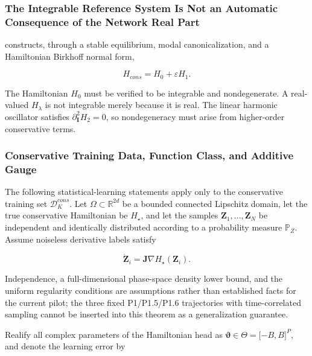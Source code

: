 \subsubsection{The Integrable Reference System Is Not an Automatic Consequence of the Network Real Part}\label{sec:chnn-4-6-1}

 constructs, through a stable equilibrium, modal canonicalization, and a Hamiltonian Birkhoff normal form,

\begin{equation}
\label{eq:chnn-4-35}
H_{cons} = H_{0} + \varepsilon H_{1}.
\end{equation}

The Hamiltonian \(H_{0}\) must be verified to be integrable and nondegenerate. A real-valued \(H_{\lambda}\) is not integrable merely because it is real. The linear harmonic oscillator satisfies \(\partial_{\mathbf{I}}^{2}H_{2}=0\), so nondegeneracy must arise from higher-order conservative terms.

\subsubsection{Conservative Training Data, Function Class, and Additive Gauge}\label{sec:chnn-4-6-2}

The following statistical-learning statements apply only to the conservative training set \(\mathcal{D}_{K}^{cons}\). Let \(\Omega\subset\mathbb{R}^{2d}\) be a bounded connected Lipschitz domain, let the true conservative Hamiltonian be \(H_{\star}\), and let the samples \(\mathbf{Z}_{1},\ldots,\mathbf{Z}_{N}\) be independent and identically distributed according to a probability measure \(\mathbb{P}_{Z}\). Assume noiseless derivative labels satisfy

\begin{equation}
\label{eq:chnn-4-36}
{\dot{\mathbf{Z}}}_{i} = \mathbf{J}\nabla H_{\star}\left( \mathbf{Z}_{i} \right).
\end{equation}

Independence, a full-dimensional phase-space density lower bound, and the uniform regularity conditions are assumptions rather than established facts for the current pilot; the three fixed P1/P1.5/P1.6 trajectories with time-correlated sampling cannot be inserted into this theorem as a generalization guarantee.

Realify all complex parameters of the Hamiltonian head as \(\bm{\vartheta}\in\Theta=\lbrack-B,B\rbrack^{P}\), and denote the learning error by

